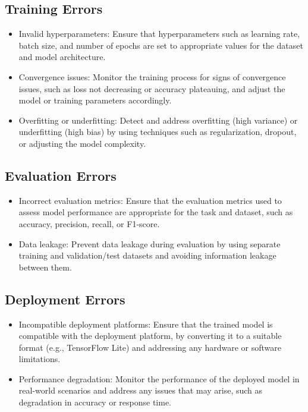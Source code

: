 			\subsection*{Training Errors}
			\begin{itemize}
				\item Invalid hyperparameters: Ensure that hyperparameters such as learning rate, batch size, and number of epochs are set to appropriate values for the dataset and model architecture.
				\item Convergence issues: Monitor the training process for signs of convergence issues, such as loss not decreasing or accuracy plateauing, and adjust the model or training parameters accordingly.
				\item Overfitting or underfitting: Detect and address overfitting (high variance) or underfitting (high bias) by using techniques such as regularization, dropout, or adjusting the model complexity.
			\end{itemize}
			
			\subsection*{Evaluation Errors}
			\begin{itemize}
				\item Incorrect evaluation metrics: Ensure that the evaluation metrics used to assess model performance are appropriate for the task and dataset, such as accuracy, precision, recall, or F1-score.
				\item Data leakage: Prevent data leakage during evaluation by using separate training and validation/test datasets and avoiding information leakage between them.
			\end{itemize}
			
			\subsection*{Deployment Errors}
			\begin{itemize}
				\item Incompatible deployment platforms: Ensure that the trained model is compatible with the deployment platform, by converting it to a suitable format (e.g., TensorFlow Lite) and addressing any hardware or software limitations.
				\item Performance degradation: Monitor the performance of the deployed model in real-world scenarios and address any issues that may arise, such as degradation in accuracy or response time.
			\end{itemize}
			
